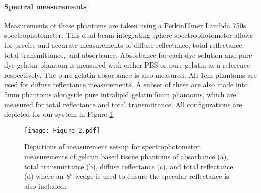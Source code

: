 \paragraph{Spectral measurements}\label{sec:methodsphantommeasure1}
Measurements of these phantoms are taken using a PerkinElmer Lambda 750s spectrophotometer. This dual-beam integrating sphere spectrophotometer allows for precise and accurate measurements of diffuse reflectance, total reflectance, total transmittance, and absorbance. Absorbance for each dye solution and pure dye gelatin phantom is measured with either PBS or pure gelatin as a reference respectively. The pure gelatin absorbance is also measured. 
All 1cm phantoms are used for diffuse reflectance measurements. A subset of these are also made into 5mm phantoms alongside pure intralipid gelatin 5mm phantoms, which are measured for total reflectance and total transmittance. 
All configurations are depicted for our system in Figure \ref{fig:spectrophotometer}. 
\begin{figure}[t!]
    \centering
    \texttt{[image: Figure\_2.pdf]}
    \caption{Depictions of measurement set-up for spectrophotometer measurements of gelatin based tissue phantoms of absorbance (a), total transmittance (b), diffuse reflectance (c), and total reflectance (d) where an 8$^o$ wedge is used to ensure the specular reflectance is also included.}
    \label{fig:spectrophotometer}
\end{figure}

